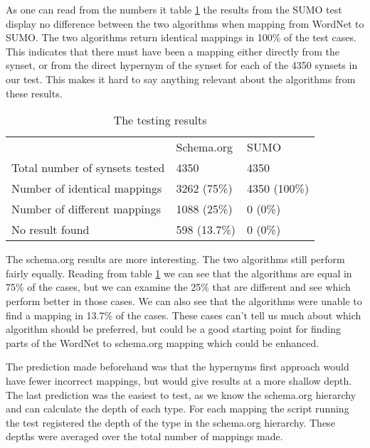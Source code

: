 As one can read from the numbers it table \ref{table:AlgorithmResults} the results from the SUMO test
display no difference between the two algorithms when mapping from WordNet to SUMO.
The two algorithms return identical mappings in 100\% of the test cases.
This indicates that there must have been a mapping either directly from the synset,
or from the direct hypernym of the synset for each of the 4350 synsets in our test.
This makes it hard to say anything relevant about the algorithms from these results.

\begin{table}[ht] %
	\centering
	\begin{tabular}{lll}
										& Schema.org	& SUMO			\\
		Total number of synsets tested 	& 4350			& 4350			\\
		Number of identical mappings 	& 3262 (75\%)	& 4350 (100\%)	\\
		Number  of different mappings	& 1088 (25\%)	& 0	(0\%)		\\
		No result found					& 598  (13.7\%)	& 0	(0\%)
	\end{tabular}
	\caption{The testing results}
	\label{table:AlgorithmResults}
\end{table}

The schema.org results are more interesting.
The two algorithms still perform fairly equally.
Reading from table \ref{table:AlgorithmResults} we can see that the algorithms are equal in 75\% of the cases,
but we can examine the 25\% that are different and see which perform better in those cases.
We can also see that the algorithms were unable to find a mapping in 13.7\% of the cases.
These cases can't tell us much about which algorithm should be preferred,
but could be a good starting point for finding parts of the WordNet to schema.org mapping which could be enhanced.

The prediction made beforehand was that the hypernyms first approach would have fewer incorrect mappings,
but would give results at a more shallow depth.
The last prediction was the easiest to test, as we know the schema.org hierarchy and can calculate the depth of each type.
For each mapping the script running the test registered the depth of the type in the schema.org hierarchy.
These depths were averaged over the total number of mappings made.

